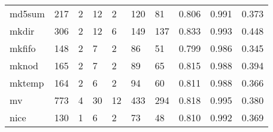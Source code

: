 \begin{longtable}{lp{1.3cm}p{1.3cm}p{1.3cm}p{1.3cm}p{1.3cm}p{1.3cm}p{1.3cm}p{1.3cm}p{1.3cm}}
md5sum    &                    217 &                                  2 &                                12 &                                2 &                               120 &                              81 &                                   0.806 &                                  0.991 &                                0.373 \\
mkdir     &                    306 &                                  2 &                                12 &                                6 &                               149 &                             137 &                                   0.833 &                                  0.993 &                                0.448 \\
mkfifo    &                    148 &                                  2 &                                 7 &                                2 &                                86 &                              51 &                                   0.799 &                                  0.986 &                                0.345 \\
mknod     &                    165 &                                  2 &                                 7 &                                2 &                                89 &                              65 &                                   0.815 &                                  0.988 &                                0.394 \\
mktemp    &                    164 &                                  2 &                                 6 &                                2 &                                94 &                              60 &                                   0.811 &                                  0.988 &                                0.366 \\
mv        &                    773 &                                  4 &                                30 &                               12 &                               433 &                             294 &                                   0.818 &                                  0.995 &                                0.380 \\
nice      &                    130 &                                  1 &                                 6 &                                2 &                                73 &                              48 &                                   0.810 &                                  0.992 &                                0.369 \\

\end{longtable}
